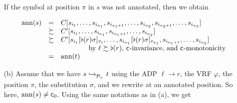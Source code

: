 \begin{myproof}
\begin{itemize}
\vspace*{-.2cm}

        
        \noindent
        If the symbol at position $\pi$ in $s$ was not annotated, then we obtain


\vspace*{-.2cm}

        
        {\small\[
          \begin{array}{lcl}
    \mathrm{ann}(s) & = & C[s_{i_1}, \ldots, s_{i_{n_1}},s_{i_{n_1 + 1}}, \ldots,
                s_{i_{n_2}},s_{i_{n_2 + 1}}, \ldots, s_{i_{n_3}}]\\
                & \succsim & C'[s_{i_1}, \ldots, s_{i_{n_1}},s_{i_{n_1 + 1}}, \ldots,
                s_{i_{n_2}}]\\
               & \succsim & C'[s_{i_1}[\flat(r) \sigma]_{\tau_{1}}, \ldots, s_{i_{n_1}}[\flat(r) \sigma]_{\tau_{n_1}},s_{i_{n_1 + 1}}, \ldots,
                s_{i_{n_2}}]\\
              &&\qquad\qquad \text{by $\ell \succsim \flat(r)$, $\mathsf{c}_{}$-invariance, and $\mathsf{c}_{}$-monotonicity}\\
                            & = & \mathrm{ann}(t)\!    
            \end{array}
          \]}


        
        \item[(b)] Assume that we have $s \mathrel{ \xhookrightarrow{{}_{\scriptstyle }} \!\!{}^{}_{\mathcal{P}_{\succ}} } t$ using the ADP $\ell \to r$, the VRF $\varphi$, the position $\pi$, the substitution $\sigma$, and we rewrite at an annotated position.
          So here, $\mathrm{ann}(s) \neq \mathsf{c}_{0}$.   Using the same notations as in (a), we get
          

\vspace*{-.2cm}


\end{itemize}
\end{myproof}
